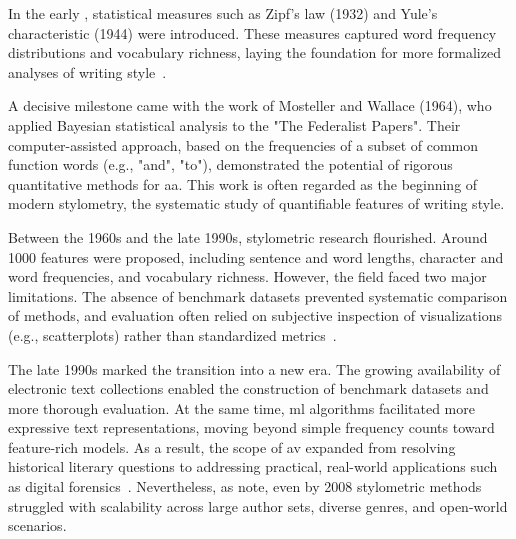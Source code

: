 
In the early , statistical measures such as Zipf's law (1932) and Yule's characteristic (1944) were introduced. 
These measures captured word frequency distributions and vocabulary richness, laying the foundation for more formalized analyses of writing style~\citep{neal_surveying_2018,stamatatos_survey_2009}.

A decisive milestone came with the work of Mosteller and Wallace (1964), who applied Bayesian statistical analysis to the "The Federalist Papers".
Their computer-assisted approach, based on the frequencies of a subset of common function words (e.g., "and", "to"), demonstrated the potential of rigorous quantitative methods for \ac{aa}. 
This work is often regarded as the beginning of modern stylometry, the systematic study of quantifiable features of writing style.

Between the 1960s and the late 1990s, stylometric research flourished.
Around \num{1000} features were proposed, including sentence and word lengths, character and word frequencies, and vocabulary richness. 
However, the field faced two major limitations. 
The absence of benchmark datasets prevented systematic comparison of methods, and evaluation often relied on subjective inspection of visualizations (e.g., scatterplots) rather than standardized metrics~\citep{stamatatos_survey_2009}.

The late 1990s marked the transition into a new era. 
The growing availability of electronic text collections enabled the construction of benchmark datasets and more thorough evaluation. 
At the same time, \ac{ml} algorithms facilitated more expressive text representations, moving beyond simple frequency counts toward feature-rich models. 
As a result, the scope of \ac{av} expanded from resolving historical literary questions to addressing practical, real-world applications such as digital forensics~\citep{stamatatos_survey_2009}. 
Nevertheless, as \citet{abbasi_writeprints_2008} note, even by 2008 stylometric methods struggled with scalability across large author sets, diverse genres, and open-world scenarios.
